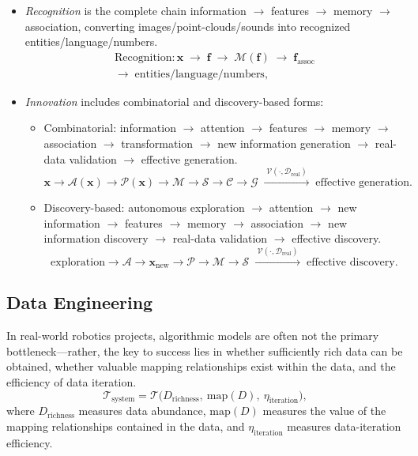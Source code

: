 \documentclass[12pt,a4paper]{article}
\newcommand{\Attn}{\mathcal{A}}
\newcommand{\Per}{\mathcal{P}}
\newcommand{\Mem}{\mathcal{M}}
\newcommand{\Srch}{\mathcal{S}}
\newcommand{\Comp}{\mathcal{C}}
\newcommand{\Imag}{\mathcal{G}}
\newcommand{\Vrfy}{\mathcal{V}}
\begin{document}
\begin{itemize}
\item \emph{Recognition} is the complete chain information $\rightarrow$ features $\rightarrow$ memory $\rightarrow$ association, converting images/point-clouds/sounds into recognized entities/language/numbers.
\begin{equation}
\begin{split}
\mathrm{Recognition}: \mathbf{x}\;\to\;\mathbf{f}
\;\to\;\Mem(\mathbf{f})\;\to\;\mathbf{f}_{\mathrm{assoc}}\\
\to\;\text{entities/language/numbers},
\end{split}
\label{eq:recognition-chain-impl}
\end{equation}

\item \emph{Innovation} includes combinatorial and discovery-based forms:
\begin{itemize}
\item Combinatorial: information $\rightarrow$ attention $\rightarrow$ features $\rightarrow$ memory $\rightarrow$ association $\rightarrow$ transformation $\rightarrow$ new information generation $\rightarrow$ real-data validation $\rightarrow$ effective generation.
\begin{equation}
\mathbf{x}\to\Attn(\mathbf{x})\to\Per(\mathbf{x})\to\Mem\to\Srch\to\Comp\to\Imag
\;\xrightarrow{\;\Vrfy(\cdot,\mathcal{D}_{\mathrm{real}})\;}\;\text{effective generation}.
\label{eq:innovation-combinatorial}
\end{equation}
\item Discovery-based: autonomous exploration $\rightarrow$ attention $\rightarrow$ new information $\rightarrow$ features $\rightarrow$ memory $\rightarrow$ association $\rightarrow$ new information discovery $\rightarrow$ real-data validation $\rightarrow$ effective discovery.
\begin{equation}
\text{exploration}\to\Attn\to\mathbf{x}_{\mathrm{new}}\to\Per\to\Mem\to\Srch
\;\xrightarrow{\;\Vrfy(\cdot,\mathcal{D}_{\mathrm{real}})\;}\;\text{effective discovery}.
\label{eq:innovation-discovery}
\end{equation}
\end{itemize}
\end{itemize}

\subsection{Data Engineering}
In real-world robotics projects, algorithmic models are often not the primary bottleneck---rather, the key to success lies in whether sufficiently rich data can be obtained, whether valuable mapping relationships exist within the data, and the efficiency of data iteration.
\begin{equation}
\mathcal{T}_{\mathrm{system}}=\mathcal{T}\bigl(D_{\mathrm{richness}},\ \mathrm{map}(D),\ \eta_{\mathrm{iteration}}\bigr),
\label{eq:data-key}
\end{equation}
where $D_{\mathrm{richness}}$ measures data abundance, $\mathrm{map}(D)$ measures the value of the mapping relationships contained in the data, and $\eta_{\mathrm{iteration}}$ measures data-iteration efficiency.
\end{document}
